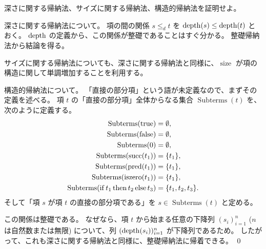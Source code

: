 \begin{jexercise*}[定理3.3.4.の証明]
  深さに関する帰納法、サイズに関する帰納法、構造的帰納法を証明せよ。
\end{jexercise*}
\begin{jproof}
  深さに関する帰納法について。
  項の間の関係 $s \leq_d t$ を $\operatorname{depth}(s) \leq \operatorname{depth}(t)$ とおく。
  $\operatorname{depth}$ の定義から、この関係が整礎であることはすぐ分かる。
  整礎帰納法から結論を得る。

  サイズに関する帰納法についても、深さに関する帰納法と同様に、$\operatorname{size}$ が項の構造に関して単調増加することを利用する。

  構造的帰納法について。
  「直接の部分項」という語が未定義なので、まずその定義を述べる。
  項 $t$ の「直接の部分項」全体からなる集合 $\operatorname{Subterms}(t)$ を、次のように定義する。
  \begin{align*}
    \operatorname{Subterms}(\operatorname{true}) & = \emptyset,
    \\ \operatorname{Subterms}(\operatorname{false}) & = \emptyset,
    \\ \operatorname{Subterms}(0) & = \emptyset,
    \\ \operatorname{Subterms}(\operatorname{succ}(t_1))
      & = \{t_1\},
    \\ \operatorname{Subterms}(\operatorname{pred}(t_1))
      & = \{t_1\},
    \\ \operatorname{Subterms}(\operatorname{iszero}(t_1))
      & = \{t_1\},
    \\ \operatorname{Subterms}(\operatorname{if} t_1 \operatorname{then} t_2 \operatorname{else} t_3)
      & = \{t_1, t_2, t_3\}.
  \end{align*}
  そして「項 $s$ が項 $t$ の直接の部分項である」を $s \in \operatorname{Subterms}(t)$ と定める。

  この関係は整礎である。
  なぜなら、項 $t$ から始まる任意の下降列 $(s_i)_{i=1}^n$ ($n$ は自然数または無限) について、列 $(\operatorname{depth}(s_i))_{i=1}^n$ が下降列であるため。
  したがって、これも深さに関する帰納法と同様に、整礎帰納法に帰着できる。
  \qed
\end{jproof}
